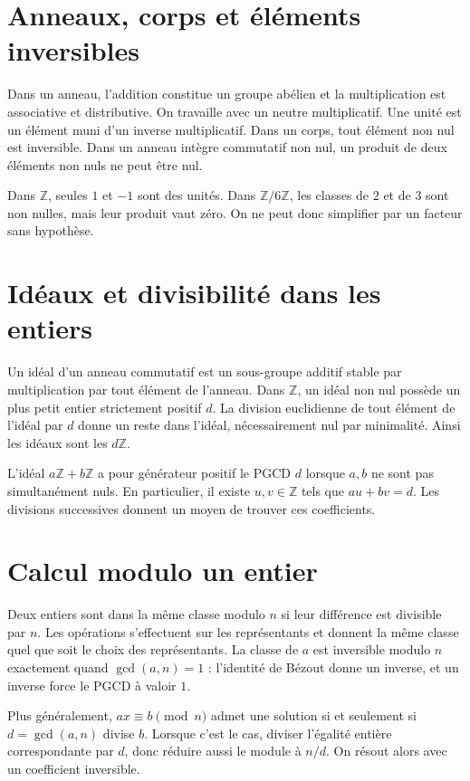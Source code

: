 \documentclass[11pt,a4paper]{article}
\begin{document}
\section*{Anneaux, corps et éléments inversibles}
Dans un anneau, l’addition constitue un groupe abélien et la multiplication est associative et distributive. On travaille avec un neutre multiplicatif. Une unité est un élément muni d’un inverse multiplicatif. Dans un corps, tout élément non nul est inversible. Dans un anneau intègre commutatif non nul, un produit de deux éléments non nuls ne peut être nul.

Dans $\mathbb Z$, seules $1$ et $-1$ sont des unités. Dans $\mathbb Z/6\mathbb Z$, les classes de $2$ et de $3$ sont non nulles, mais leur produit vaut zéro. On ne peut donc simplifier par un facteur sans hypothèse.

\section*{Idéaux et divisibilité dans les entiers}
Un idéal d’un anneau commutatif est un sous-groupe additif stable par multiplication par tout élément de l’anneau. Dans $\mathbb Z$, un idéal non nul possède un plus petit entier strictement positif $d$. La division euclidienne de tout élément de l’idéal par $d$ donne un reste dans l’idéal, nécessairement nul par minimalité. Ainsi les idéaux sont les $d\mathbb Z$.

L’idéal $a\mathbb Z+b\mathbb Z$ a pour générateur positif le PGCD $d$ lorsque $a,b$ ne sont pas simultanément nuls. En particulier, il existe $u,v\in\mathbb Z$ tels que $au+bv=d$. Les divisions successives donnent un moyen de trouver ces coefficients.

\section*{Calcul modulo un entier}
Deux entiers sont dans la même classe modulo $n$ si leur différence est divisible par $n$. Les opérations s’effectuent sur les représentants et donnent la même classe quel que soit le choix des représentants. La classe de $a$ est inversible modulo $n$ exactement quand $\gcd(a,n)=1$ : l’identité de Bézout donne un inverse, et un inverse force le PGCD à valoir $1$.

Plus généralement, $ax\equiv b\pmod n$ admet une solution si et seulement si $d=\gcd(a,n)$ divise $b$. Lorsque c’est le cas, diviser l’égalité entière correspondante par $d$, donc réduire aussi le module à $n/d$. On résout alors avec un coefficient inversible.
\end{document}
